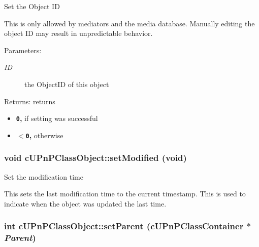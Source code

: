 Set the Object ID

This is only allowed by mediators and the media database. Manually editing the object ID may result in unpredictable behavior.

\begin{Desc}
\item[Parameters:]
\begin{description}
\item[{\em ID}]the ObjectID of this object \end{description}
\end{Desc}
\begin{Desc}
\item[Returns:]returns\begin{itemize}
\item {\bf {\tt 0},} if setting was successful\item {\bf {\tt $<$0},} otherwise \end{itemize}
\end{Desc}
\hypertarget{classcUPnPClassObject_f5c5ca8dd663fe6c59ee2d29dba870e5}{
\subsubsection[{setModified}]{\setlength{\rightskip}{0pt plus 5cm}void cUPnPClassObject::setModified (void)}}
\label{classcUPnPClassObject_f5c5ca8dd663fe6c59ee2d29dba870e5}


Set the modification time

This sets the last modification time to the current timestamp. This is used to indicate when the object was updated the last time. \hypertarget{classcUPnPClassObject_d092a68523a7e3a8bd8d1b6f79888eff}{
\subsubsection[{setParent}]{\setlength{\rightskip}{0pt plus 5cm}int cUPnPClassObject::setParent ({\bf cUPnPClassContainer} $\ast$ {\em Parent})}}
\label{classcUPnPClassObject_d092a68523a7e3a8bd8d1b6f79888eff}


